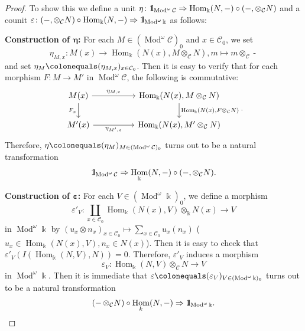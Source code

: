 \documentclass{surv-l}
\numberwithin{equation}{chapter}
\numberwithin{figure}{chapter}
\theoremstyle{plain}
\theoremstyle{definition}
\theoremstyle{remark}
\newcommand{\id}{1\kern-.25em{\text{{\rm l}}}}
\newcommand{\Ar}[3]{\ar[from={#1}, to={#2}, #3]}
\DeclareMathOperator{\Hom}{Hom}
\DeclareMathOperator{\Mod}{Mod}
\DeclareMathOperator{\blank}{-}
\begin{document}
\begin{proof}
To show this we define a unit
$\eta \colon \id_{\Mod^\omega{\mathcal{C}}} \Rightarrow \Hom_\Bbbk(N,\blank) \circ (\blank, \otimes_{\mathcal{C}} N)$
and a counit
$\varepsilon \colon (\blank, \otimes_{\mathcal{C}} N) \circ \Hom_\Bbbk(N,\blank) \Rightarrow \id_{\Mod^\omega\Bbbk}$
as follows:

{\bf Construction of $\boldsymbol{\eta}$:}
For each $M \in (\Mod^\omega{\mathcal{C}})_0$ and $x \in {\mathcal{C}}_0$, we set
\[
\eta_{M,x} \colon M(x) \to \Hom_\Bbbk(N(x), M\otimes_{\mathcal{C}} N), m \mapsto m \otimes_{\mathcal{C}} \blank
\]
and set $\eta_M\colonequals  (\eta_{M,x})_{x \in {\mathcal{C}}_0}$.
Then it is easy to verify that for each morphism $F \colon M \to M'$
in $\Mod^\omega{\mathcal{C}}$, the following is commutative:
\[
\begin{tikzcd}[column sep=5em]
M(x) & \Hom_\Bbbk(N(x), M \otimes_{\mathcal{C}} N)\\
M'(x) & \Hom_\Bbbk(N(x), M' \otimes_{\mathcal{C}} N)
\Ar{1-1}{1-2}{"{\eta_{M,x}}"}
\Ar{2-1}{2-2}{"{\eta_{M',x}}" '}
\Ar{1-1}{2-1}{"F_x"'}
\Ar{1-2}{2-2}{"{\Hom_\Bbbk(N(x), F \otimes_{\mathcal{C}} N)}"}
\end{tikzcd}.
\]
Therefore, $\eta\colonequals  (\eta_M)_{M \in (\Mod^\omega{\mathcal{C}})_0}$ turns out to be
a natural transformation
\[
\id_{\Mod^\omega{\mathcal{C}}} \Rightarrow \Hom_\Bbbk(N,\blank) \circ (\blank, \otimes_{\mathcal{C}} N).
\]

{\bf Construction of $\boldsymbol{\varepsilon}$:}
For each $V \in (\Mod^\omega \Bbbk)_0$, we define a morphism
\[
\varepsilon'_V \colon \coprod_{x \in {\mathcal{C}}_0} \Hom_\Bbbk(N(x), V) \otimes_\Bbbk N(x) \to V
\]
in $\Mod^\omega \Bbbk$ by
$(u_x \otimes n_x)_{x \in {\mathcal{C}}_0} \mapsto \sum_{x \in {\mathcal{C}}_0}u_x(n_x)$
($u_x \in \Hom_\Bbbk(N(x), V), n_x \in N(x)$).
Then it is easy to check that
$\varepsilon'_V(I(\Hom_\Bbbk(N, V), N)) = 0$.
Therefore,
$\varepsilon'_V$ induces a morphism
\[
\varepsilon_V \colon  \Hom_\Bbbk(N, V) \otimes_{\mathcal{C}} N \to V
\]
in $\Mod^\omega \Bbbk$.
Then it is immediate that
$\varepsilon\colonequals  (\varepsilon_V)_{V \in (\Mod^\omega \Bbbk)_0}$ turns out to be a natural transformation
\[
(\blank \otimes_{\mathcal{C}} N)\circ \Hom_k(N, \blank) \Rightarrow \id_{\Mod^\omega \Bbbk}.
\]


\end{proof}
\end{document}
